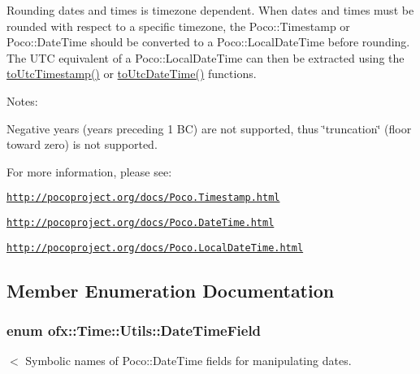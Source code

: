 Rounding dates and times is timezone dependent. When dates and times must be rounded with respect to a specific timezone, the Poco\-::\-Timestamp or Poco\-::\-Date\-Time should be converted to a Poco\-::\-Local\-Date\-Time before rounding. The U\-T\-C equivalent of a Poco\-::\-Local\-Date\-Time can then be extracted using the \hyperlink{classofx_1_1_time_1_1_utils_a9e1c01fc626b4cf7f0c8f145b8ac7ff6}{to\-Utc\-Timestamp()} or \hyperlink{classofx_1_1_time_1_1_utils_a69ea2e034f118c86ce9320f0e7ac4687}{to\-Utc\-Date\-Time()} functions.

Notes\-:
\begin{DoxyItemize}
\item Negative years (years preceding 1 B\-C) are not supported, thus \char`\"{}truncation\char`\"{} (floor toward zero) is not supported.
\end{DoxyItemize}

For more information, please see\-:
\begin{DoxyItemize}
\item \href{http://pocoproject.org/docs/Poco.Timestamp.html}{\tt http\-://pocoproject.\-org/docs/\-Poco.\-Timestamp.\-html}
\item \href{http://pocoproject.org/docs/Poco.DateTime.html}{\tt http\-://pocoproject.\-org/docs/\-Poco.\-Date\-Time.\-html}
\item \href{http://pocoproject.org/docs/Poco.LocalDateTime.html}{\tt http\-://pocoproject.\-org/docs/\-Poco.\-Local\-Date\-Time.\-html} 
\end{DoxyItemize}

\subsection{Member Enumeration Documentation}
\hypertarget{classofx_1_1_time_1_1_utils_aaab0e5bd305761231f063a0701785112}{
\subsubsection[{Date\-Time\-Field}]{\setlength{\rightskip}{0pt plus 5cm}enum {\bf ofx\-::\-Time\-::\-Utils\-::\-Date\-Time\-Field}}}\label{classofx_1_1_time_1_1_utils_aaab0e5bd305761231f063a0701785112}


$<$ Symbolic names of Poco\-::\-Date\-Time fields for manipulating dates. 

